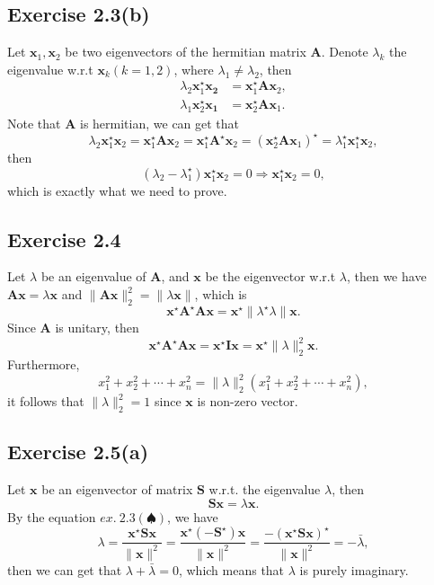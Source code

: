\documentclass{article}
\begin{document}
\subsection{Exercise 2.3(b)}
    Let $\bm{x}_1, \bm{x}_2$ be  two eigenvectors of the hermitian matrix $\bm{A}$. Denote $\lambda_k $ the eigenvalue w.r.t $\bm{x}_k (k=1,2)$, where $\lambda_1 \neq \lambda_2 $, then
    $$
    \begin{aligned}
    \lambda_2 \bm{x}_1^\star \bm{x_2} &= \bm{x}_1^{\star} \bm{A} \bm{x}_{2}, \\
    \lambda_1 \bm{x}_2^\star \bm{x_1} &= \bm{x}_2^{\star} \bm{A} \bm{x}_{1}.
    \end{aligned}
    $$
    Note that $\bm{A}$ is hermitian, we can get that
    $$
    \lambda_2 \bm{x}_1^{\star} \bm{x}_2 = \bm{x}_1^{\star} \bm{A} \bm{x}_2 = \bm{x}_1^{\star} \bm{A}^{\star} \bm{x}_2 =  (\bm{x}_2^{\star} \bm{A} \bm{x}_1)^{\star} = \lambda_1^{\star} \bm{x}_1^{\star} \bm{x}_2,
    $$
    then
    $$
    (\lambda_2 - \lambda_1^{\star}) \bm{x}_1^{\star} \bm{x}_2 = 0 \Rightarrow \bm{x}_1^{\star} \bm{x}_2 = 0,
    $$
    which is exactly what we need to prove.
    
\subsection{Exercise 2.4}
    Let $\lambda$ be an eigenvalue of $\bm{A}$, and $\bm{x}$ be the eigenvector w.r.t $\lambda$, then we have $\bm{Ax} = \lambda \bm{x}$ and $\| \bm{Ax} \|_2^2 = \| \lambda \bm{x} \|$, which is
    $$
    \bm{x}^{\star} \bm{A}^{\star} \bm{Ax} = \bm{x}^{\star} \| \lambda^\star \lambda \| \bm{x}. 
    $$
    Since $\bm{A}$ is unitary, then
    $$
    \bm{x}^{\star} \bm{A}^\star \bm{A} \bm{x} = \bm{x}^{\star} \bm{Ix} = \bm{x}^{\star} \| \lambda \|_2^2 \bm{x}.
    $$
    Furthermore,
    $$
    x_1^2 + x_2^2 + \cdots + x_n^2 = \| \lambda \|_2^2(x_1^2 + x_2^2 + \cdots + x_n^2),
    $$
    it follows that $\| \lambda \|_2^2 = 1$ since $\bm{x}$ is non-zero vector.
    
\subsection{Exercise 2.5(a)}
     Let $\bm{x}$ be an eigenvector of matrix $\bm{S}$ w.r.t. the eigenvalue $\lambda$, then 
     \[\bm{S}\bm{x} = \lambda \bm{x}.\]
     By the equation $ex.~2.3(\spadesuit)$, we have
    $$
    \lambda = \frac{\bm{x}^{\star} \bm{S} \bm{x} }{ \| \bm{x} \|^{2}} = \frac{\bm{x}^{\star} (-\bm{S}^{\star}) \bm{x} }{ \| \bm{x} \|^{2}} = \frac{-(\bm{x}^{\star} \bm{S} \bm{x} )^{\star}}{ \| \bm{x} \|^{2}} = -\bar{\lambda},
    $$
    then we can get that $\lambda + \bar{\lambda} = 0$, which means that $\lambda$ is purely imaginary.
    
\end{document}

